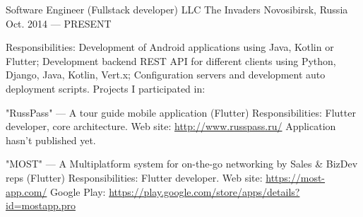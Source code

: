 


\begin{cventries}


\cventry
{Software Engineer (Fullstack developer)} %
{LLC The Invaders} %
{Novosibirsk, Russia} %
{Oct. 2014 --- PRESENT} %
{
Responsibilities: Development of Android applications using Java, Kotlin or Flutter; Development backend REST API for different clients using Python, Django, Java, Kotlin, Vert.x; Configuration servers and development auto deployment scripts.\linebreak
\linebreak
Projects I participated in:\linebreak
\linebreak
\begin{cvitems}
    \item {
        \begin{flushleft}
            "RussPass" --- A tour guide mobile application (Flutter)\linebreak
            Responsibilities: Flutter developer, core architecture.\linebreak
            Web site: \url{http://www.russpass.ru/}\linebreak
            Application hasn't published yet.\linebreak
        \end{flushleft}
    }
    \item {
        \begin{flushleft}
            "MOST" --- A Multiplatform system for on-the-go networking by Sales \& BizDev reps (Flutter)\linebreak
            Responsibilities: Flutter developer.\linebreak
            Web site: \url{https://most-app.com/}\linebreak
            Google Play: \url{https://play.google.com/store/apps/details?id=mostapp.pro}\linebreak

\end{flushleft}}
\end{cvitems}}
\end{cventries}
